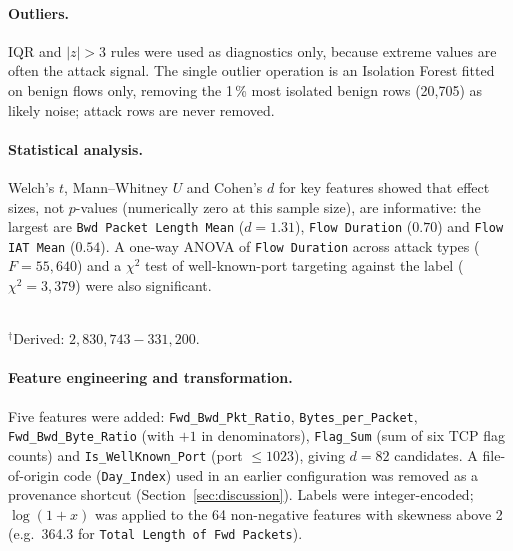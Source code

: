 \documentclass[11pt,a4paper]{article}
\newcommand{\feat}[1]{\texttt{#1}}
\begin{document}
\paragraph{Outliers.} IQR and $|z|>3$ rules were used as diagnostics only, because extreme values are often the attack signal. The single outlier operation is an Isolation Forest \parencite{liu2008} fitted on benign flows only, removing the 1\,\% most isolated benign rows (20{,}705) as likely noise; attack rows are never removed.

\paragraph{Statistical analysis.} Welch's $t$, Mann--Whitney $U$ and Cohen's $d$ for key features showed that effect sizes, not $p$-values (numerically zero at this sample size), are informative: the largest are \feat{Bwd Packet Length Mean} ($d=1.31$), \feat{Flow Duration} ($0.70$) and \feat{Flow IAT Mean} ($0.54$). A one-way ANOVA of \feat{Flow Duration} across attack types ($F=55{,}640$) and a $\chi^2$ test of well-known-port targeting against the label ($\chi^2=3{,}379$) were also significant.

\begin{table}[tbp]
\centering
\caption{Preprocessing steps and resulting row counts.}
\label{tab:prep}
\scriptsize
{}
\\[1pt]{\scriptsize $^{\dagger}$Derived: $2{,}830{,}743-331{,}200$.}
\end{table}

\paragraph{Feature engineering and transformation.} Five features were added: \feat{Fwd_Bwd_Pkt_Ratio}, \feat{Bytes_per_Packet}, \feat{Fwd_Bwd_Byte_Ratio} (with $+1$ in denominators), \feat{Flag_Sum} (sum of six TCP flag counts) and \feat{Is_WellKnown_Port} (port $\leq1023$), giving $d=82$ candidates. A file-of-origin code (\feat{Day_Index}) used in an earlier configuration was removed as a provenance shortcut (Section~\ref{sec:discussion}). Labels were integer-encoded; $\log(1+x)$ was applied to the 64 non-negative features with skewness above 2 (e.g.\ 364.3 for \feat{Total Length of Fwd Packets}).
\end{document}
